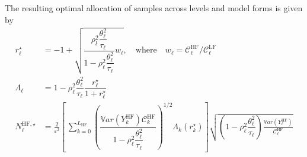 The resulting optimal allocation of samples across levels and model forms is given by
 \begin{equation*}
 \begin{split}
  r_\ell^{\star} &= -1 + \sqrt{ \dfrac{\rho_l^2 \dfrac{\theta_\ell^2}{\tau_\ell} }{1-\rho_\ell^2 \dfrac{\theta_\ell^2}{\tau_\ell}} w_{\ell}}, \quad \mathrm{where} \quad w_{\ell} 
               =  \mathcal{C}_{\ell}^{\mathrm{HF}} / \mathcal{C}_{\ell}^{\mathrm{LF}}\\
  \Lambda_{\ell} &= 1 - \rho_\ell^2 \dfrac{\theta_\ell^2}{\tau_\ell} \dfrac{r_\ell^{\star}}{1+r_\ell^{\star}}\\
  N_{\ell}^{\mathrm{HF},\star} &= \frac{2}{\varepsilon^2} \!\! \left[ \, \sum_{k=0}^{ L_{\mathrm{HF}} } 
       \left( \dfrac{ \mathbb{V}ar\left(Y_k^{ \mathrm{HF} } \right) \mathcal{C}_{k}^{\mathrm{HF}}}{1-\rho_\ell^2 \dfrac{\theta_\ell^2}{\tau_\ell}} \right)^{1/2} \Lambda_{k}(r_k^{\star})\right] 
               \sqrt{ \left( 1 - \rho_\ell^2 \dfrac{\theta_\ell^2}{\tau_\ell} \right) \frac{ \mathbb{V}ar\left( Y^{\mathrm{HF}}_{\ell} \right) }{\mathcal{C}_{\ell}^{\mathrm{HF}}}}
 \end{split}
\end{equation*}
